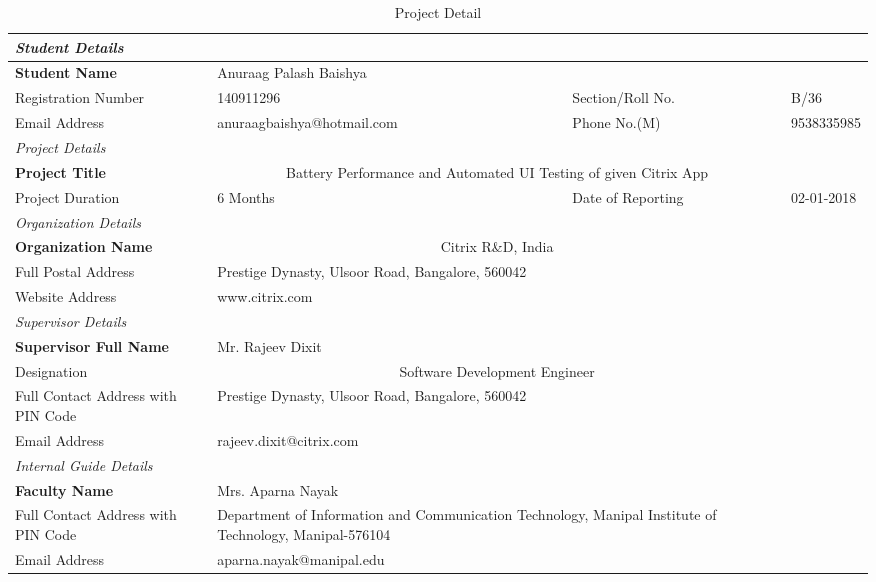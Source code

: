 \captionsetup[table]{list=no}
\begin{table}
\begin{scriptsize}
\caption{Project Detail}
\begin{tabularx}{\linewidth}{|m| b| m| m|}

\multicolumn{4}{l}{\textit{Student Details}}\\ 
\hline
\textbf{Student Name}&\multicolumn{2}{p{8cm}}{Anuraag Palash Baishya}&\\ \hline
Registration Number&140911296&Section/Roll No.& B/36\\ \hline
Email Address&{anuraagbaishya@hotmail.com}&Phone No.(M)&9538335985 \\  \hline

\multicolumn{4}{l}{\textit{Project Details}}\\ \hline
\textbf{Project Title}&\multicolumn{2}{c}{Battery Performance and Automated UI Testing of given Citrix App}& \\ \hline
Project Duration& 6 Months&Date of Reporting& 02-01-2018 \\ \hline

\multicolumn{4}{l}{\textit{Organization Details}}\\ \hline
\textbf{Organization Name}&\multicolumn{2}{c}{Citrix R\&D, India}& \\ \hline
Full Postal Address&\multicolumn{2}{p{8cm}}{Prestige Dynasty, Ulsoor Road, Bangalore, 560042} &\\ \hline
Website Address&\multicolumn{2}{X}{www.citrix.com} &\\ \hline

\multicolumn{4}{l}{\textit{Supervisor Details}}\\ \hline
\textbf{Supervisor Full Name}&\multicolumn{2}{X}{Mr. Rajeev Dixit}& \\ \hline
Designation&\multicolumn{2}{c}{Software Development Engineer} &\\ \hline
Full Contact Address with PIN Code&\multicolumn{2}{p{8cm}}{Prestige Dynasty, Ulsoor Road, Bangalore, 560042}& \\ \hline
Email Address&\multicolumn{2}{p{8cm}}{rajeev.dixit@citrix.com}&\\ \hline

\multicolumn{4}{l}{\textit{Internal Guide Details}}\\ \hline
\textbf{Faculty Name}&\multicolumn{2}{X}{Mrs. Aparna Nayak} &\\ \hline
Full Contact Address with PIN Code&\multicolumn{2}{p{8cm}}{Department of Information and Communication Technology,  Manipal Institute of Technology, Manipal-576104}& \\ \hline
Email Address&\multicolumn{2}{p{8cm}}{aparna.nayak@manipal.edu}&\\  \hline
\end{tabularx}
\end{scriptsize}
\end{table}
